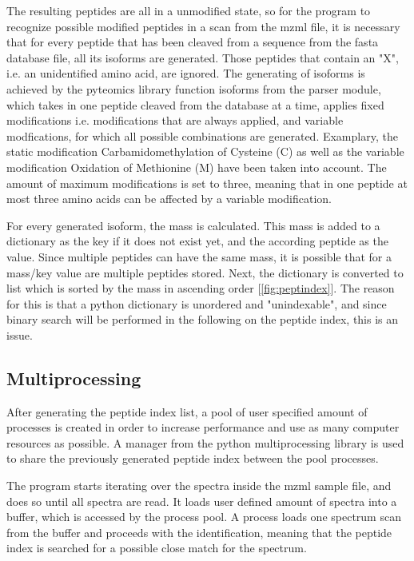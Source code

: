 \documentclass[11pt]{article}
\begin{document}
The resulting peptides are all in a unmodified state, so for the program to recognize possible modified peptides in a scan from the mzml file, it is necessary that for every peptide that has been cleaved from a sequence from the fasta database file, all its isoforms are generated. Those peptides that contain an "X", i.e. an unidentified amino acid, are ignored. The generating of isoforms is achieved by the pyteomics library function isoforms from the parser module, which takes in one peptide cleaved from the database at a time, applies fixed modifications i.e. modifications that are always applied, and variable modfications, for which all possible combinations are generated. Examplary, the static modification Carbamidomethylation of Cysteine (C) as well as the variable modification Oxidation of Methionine (M) have been taken into account. The amount of maximum modifications is set to three, meaning that in one peptide at most three amino acids can be affected by a variable modification.

For every generated isoform, the mass is calculated. This mass is added to a dictionary as the key if it does not exist yet, and the according peptide as the value. Since multiple peptides can have the same mass, it is possible that for a mass/key value are multiple peptides stored. Next, the dictionary is converted to list which is sorted by the mass in ascending order [\cref{fig:peptindex}]. The reason for this is that a python dictionary is unordered and "unindexable", and since binary search will be performed in the following on the peptide index, this is an issue.
 
\subsection{Multiprocessing}
After generating the peptide index list, a pool of user specified amount of processes is created in order to increase performance and use as many computer resources as possible. A manager from the python multiprocessing library is used to share the previously generated peptide index between the pool processes. 

The program starts iterating over the spectra inside the mzml sample file, and does so until all spectra are read. It loads user defined amount of spectra into a buffer, which is accessed by the process pool. A process loads one spectrum scan from the buffer and proceeds with the identification, meaning that the peptide index is searched for a possible close match for the spectrum.
\end{document}
